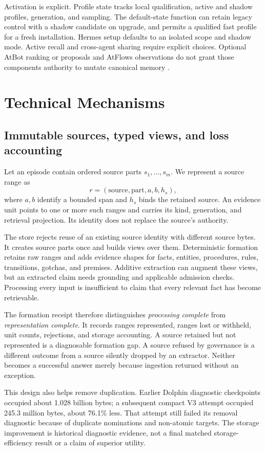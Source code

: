 \documentclass[11pt]{article}
\begin{document}
Activation is explicit. Profile state tracks local qualification, active and shadow profiles, generation, and sampling. The default-state function can retain legacy control with a shadow candidate on upgrade, and permits a qualified fast profile for a fresh installation. Hermes setup defaults to an isolated scope and shadow mode. Active recall and cross-agent sharing require explicit choices. Optional AtBot ranking or proposals and AtFlows observations do not grant those components authority to mutate canonical memory \citep{release}.

\section{Technical Mechanisms}
\label{sec:mechanisms}
\subsection{Immutable sources, typed views, and loss accounting}
Let an episode contain ordered source parts $s_1,\ldots,s_m$. We represent a source range as
\[
r=(\mathrm{source},\mathrm{part},a,b,h_s),
\]
where $a,b$ identify a bounded span and $h_s$ binds the retained source. An evidence unit points to one or more such ranges and carries its kind, generation, and retrieval projection. Its identity does not replace the source's authority.

The store rejects reuse of an existing source identity with different source bytes. It creates source parts once and builds views over them. Deterministic formation retains raw ranges and adds evidence shapes for facts, entities, procedures, rules, transitions, gotchas, and premises. Additive extraction can augment these views, but an extracted claim needs grounding and applicable admission checks. Processing every input is insufficient to claim that every relevant fact has become retrievable.

The formation receipt therefore distinguishes \emph{processing complete} from \emph{representation complete}. It records ranges represented, ranges lost or withheld, unit counts, rejections, and storage accounting. A source retained but not represented is a diagnosable formation gap. A source refused by governance is a different outcome from a source silently dropped by an extractor. Neither becomes a successful answer merely because ingestion returned without an exception.

This design also helps remove duplication. Earlier Dolphin diagnostic checkpoints occupied about 1.028 billion bytes; a subsequent compact V3 attempt occupied 245.3 million bytes, about 76.1\% less. That attempt still failed its removal diagnostic because of duplicate nominations and non-atomic targets. The storage improvement is historical diagnostic evidence, not a final matched storage-efficiency result or a claim of superior utility.
\end{document}
